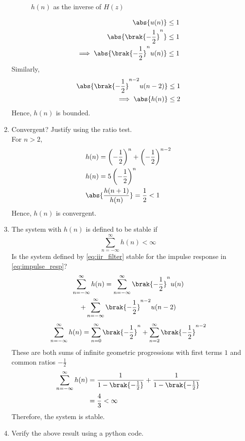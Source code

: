 \documentclass[journal,12pt,twocolumn]{IEEEtran}
\renewcommand\thesection{\arabic{section}}
\begin{document}
\begin{enumerate}[label=\thesection.\arabic*]
\begin{figure}[!ht]
		\caption{$h(n)$ as the inverse of $H(z)$}
		\label{fig:hn}
	\end{figure}
	\begin{align}
	\abs{u(n)} &\le 1 \\
	\abs{\brak{-\frac12}^n} &\le 1 \\
	\implies \abs{\brak{-\frac12}^n u(n)} &\le 1
\end{align}
Similarly,
\begin{align}
	\abs{\brak{-\frac12}^{n-2} u(n-2)} &\le 1 \\
	\implies \abs{h(n)} &\le 2
\end{align}
Hence, $h(n)$ is bounded.
\item Convergent? Justify using the ratio test.\\
\solution For $n>2$,
\begin{align}
	&h(n) =  \left(-\frac{1}{2}\right)^n + \left(-\frac{1}{2}\right)^{n-2} \\
	&h(n) = 5\left(-\frac{1}{2}\right)^n \\
	&\abs{\frac{h(n+1)}{h(n)}} = \frac{1}{2} < 1
\end{align}
Hence, $h(n)$ is convergent.	
\item The system with $h(n)$ is defined to be stable if
	\begin{equation}
		\sum_{n=-\infty}^{\infty}h(n) < \infty
	\end{equation}
	Is the system defined by \eqref{eq:iir_filter} stable for the impulse response in \eqref{eq:impulse_resp}?\\
	\solution
	\begin{multline}
		\sum_{n=-\infty}^{\infty}h(n) = \sum_{n=-\infty}^{\infty} \brak{-\frac12}^n u(n) \\
		+ \sum_{n=-\infty}^{\infty} \brak{-\frac12}^{n-2} u(n-2)
	\end{multline}
	\begin{align}
		\sum_{n=-\infty}^{\infty}h(n) = \sum_{n=0}^{\infty}\brak{-\frac12}^n + \sum_{n=2}^{\infty}\brak{-\frac12}^{n-2}
	\end{align}
	These are both sums of infinite geometric progressions with first terms $1$ and common ratios $-\frac12$
	\begin{align}
		\sum_{n=-\infty}^{\infty}h(n) &= \frac{1}{1 - \brak{-\frac12}} + \frac{1}{1 - \brak{-\frac12}} \\
		&= \frac{4}{3} < \infty
	\end{align}
	Therefore, the system is stable.
	\item Verify the above result using a python code.

\end{enumerate}
\end{document}
